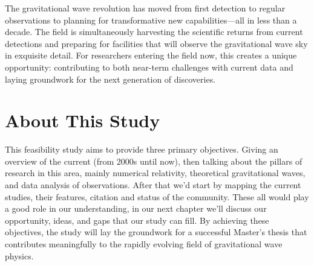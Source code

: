 The gravitational wave revolution has moved from first detection to regular observations to planning for transformative new capabilities—all in less than a decade.
The field is simultaneously harvesting the scientific returns from current detections and preparing for facilities that will observe the gravitational wave sky in exquisite detail.
For researchers entering the field now, this creates a unique opportunity: contributing to both near-term challenges with current data and laying groundwork for the next generation of discoveries.

\section{About This Study}\label{sec:about-this-study}

This feasibility study aims to provide three primary objectives.
Giving an overview of the current (from 2000s until now), then talking about the pillars of research in this area, mainly numerical relativity, theoretical gravitational waves, and data analysis of observations.
After that we'd start by mapping the current studies, their features, citation and status of the community.
These all would play a good role in our understanding, in our next chapter we'll discuss our opportunity, ideas, and gaps that our study can fill.
By achieving these objectives, the study will lay the groundwork for a successful Master's thesis that contributes meaningfully to the rapidly evolving field of gravitational wave physics.

